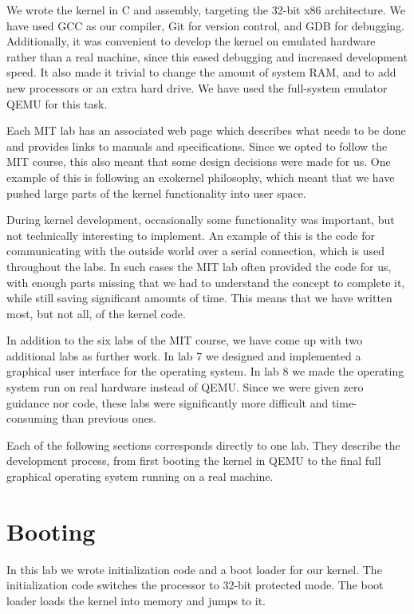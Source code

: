 \documentclass{report}
\begin{document}
We wrote the kernel in C and assembly, targeting the 32-bit x86 architecture.
We have used GCC as our compiler, Git for version control, and GDB for
debugging. Additionally, it was convenient to develop the kernel on emulated
hardware rather than a real machine, since this eased debugging and increased
development speed. It also made it trivial to change the amount of system RAM,
and to add new processors or an extra hard drive. We have used the full-system
emulator QEMU for this task.

Each MIT lab has an associated web page which describes what needs to be done
and provides links to manuals and specifications. Since we opted
to follow the MIT course, this also meant that some design decisions were made
for us. One example of this is following an exokernel philosophy, which
meant that we have pushed large parts of the kernel functionality into user
space.

During kernel development, occasionally some functionality was important, but
not technically interesting to implement. An example of this is the code for
communicating with the outside world over a serial connection, which is used
throughout the labs. In such cases the MIT lab often provided the code for
us, with enough parts missing that we had to understand the concept to complete
it, while still saving significant amounts of time. This means that we have
written most, but not all, of the kernel code.


In addition to the six labs of the MIT course, we have come up with two
additional labs as further work. In lab 7 we designed and implemented
a graphical user interface for the operating system. In lab 8 we made the
operating system run on real hardware instead of QEMU. Since we were given
zero guidance nor code, these labs were significantly more difficult and
time-consuming than previous ones.

Each of the following sections corresponds directly to one lab. They describe
the development process, from first booting the kernel in QEMU to the final 
full graphical operating system running on a real machine.




\chapter{Booting}
\label{sec:lab1}

In this lab we wrote initialization code and a boot loader for our kernel. 
The initialization code switches the processor to 32-bit protected mode. The
boot loader loads the kernel into memory and jumps to it.
\end{document}
